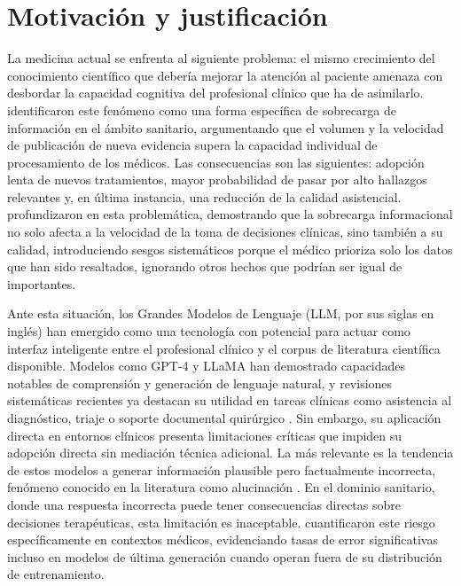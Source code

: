 \documentclass[11pt,a4paper,spanish]{book}
\numberwithin{equation}{chapter}
\numberwithin{figure}{chapter}
\begin{document}
\section{Motivación y justificación}
La medicina actual se enfrenta al siguiente problema: el mismo crecimiento del conocimiento científico que debería mejorar la atención al paciente amenaza con desbordar la capacidad cognitiva del profesional clínico que ha de asimilarlo. \cite{rebitzer_influence_2008} identificaron este fenómeno como una forma específica de sobrecarga de información en el ámbito sanitario, argumentando que el volumen y la velocidad de publicación de nueva evidencia supera la capacidad individual de procesamiento de los médicos. Las consecuencias son las siguientes: adopción lenta de nuevos tratamientos, mayor probabilidad de pasar por alto hallazgos relevantes y, en última instancia, una reducción de la calidad asistencial. \cite{laker_quality_2018} profundizaron en esta problemática, demostrando que la sobrecarga informacional no solo afecta a la velocidad de la toma de decisiones clínicas, sino también a su calidad, introduciendo sesgos sistemáticos porque el médico prioriza solo los datos que han sido resaltados, ignorando otros hechos que podrían ser igual de importantes.

Ante esta situación, los Grandes Modelos de Lenguaje (LLM, por sus siglas en inglés) han emergido como una tecnología con potencial para actuar como interfaz inteligente entre el profesional clínico y el corpus de literatura científica disponible. Modelos como GPT-4 \cite{openai_gpt-4_2024} y LLaMA \cite{grattafiori2024llama3herdmodels} han demostrado capacidades notables de comprensión y generación de lenguaje natural, y revisiones sistemáticas recientes ya destacan su utilidad en tareas clínicas como asistencia al diagnóstico, triaje o soporte documental quirúrgico \cite{jcm13113041}. Sin embargo, su aplicación directa en entornos clínicos presenta limitaciones críticas que impiden su adopción directa sin mediación técnica adicional. La más relevante es la tendencia de estos modelos a generar información plausible pero factualmente incorrecta, fenómeno conocido en la literatura como alucinación \cite{ji_survey_2023}. En el dominio sanitario, donde una respuesta incorrecta puede tener consecuencias directas sobre decisiones terapéuticas, esta limitación es inaceptable. \cite{pal_med-halt_2023} cuantificaron este riesgo específicamente en contextos médicos, evidenciando tasas de error significativas incluso en modelos de última generación cuando operan fuera de su distribución de entrenamiento.
\end{document}
